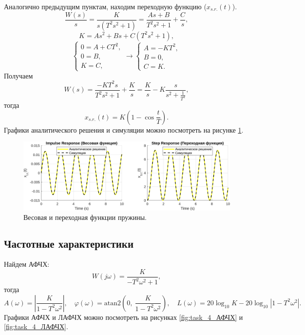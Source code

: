 Аналогично предыдущим пунктам, находим переходную функцию ($x_{s.r.}(t)$).
\begin{equation*}
    \frac{W(s)}{s}=\frac{K}{s(T^2s^2+1)}=\frac{As+B}{T^2s^2+1}+\frac{C}{s},
\end{equation*}
\begin{equation*}
    K=As^2+Bs+C(T^2s^2+1),
\end{equation*}
\begin{equation*}
    \begin{cases}
        0=A+CT^2,\\
        0=B,\\
        K=C,
    \end{cases}\rightarrow
    \begin{cases}
        A=-KT^2,\\
        B=0,\\
        C=K.
    \end{cases}
\end{equation*}
Получаем
\begin{equation*}
    W(s)=\frac{-KT^2s}{T^2s^2+1}+\frac{K}{s}
    =\frac{K}{s}-K\frac{s}{s^2+\frac{1}{T^2}},
\end{equation*}
тогда
\begin{equation*}
    x_{s.r.}(t)=K(1-\cos\frac{t}{T}).
\end{equation*}
Графики аналитического решения и симуляции можно посмотреть на рисунке \ref{fig:task_4_impl_step}.

\begin{figure}[htbp]
    \centering
    \includegraphics[width=1\textwidth]{figs/task_4_impl_step.png}
    \caption{Весовая и переходная функции пружины.}
    \label{fig:task_4_impl_step}
\end{figure}

\subsection{Частотные характеристики}

Найдем АФЧХ:
\begin{equation*}
    W(j\omega)=\frac{K}{-T^2\omega^2+1},
\end{equation*}
тогда
\begin{equation*}
    A(\omega)=\left| \frac{K}{1-T^2\omega^2} \right|,\quad \varphi(\omega)=\text{atan2}\left( 0,\ \frac{K}{1-T^2\omega^2} \right), \quad L(\omega)=20\log_{10}K-20\log_{10}\left| 1-T^2\omega^2 \right|.
\end{equation*}
Графики АФЧХ и ЛАФЧХ можно посмотреть на рисунках \ref{fig:task_4_АФЧХ} и \ref{fig:task_4_ЛАФЧХ}.

